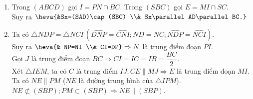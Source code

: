 \begin{bt}
{\begin{enumerate}
{}
			\item Trong $(ABCD)$ gọi $I=PN\cap BC$. Trong $(SBC)$ gọi $E=MI\cap SC$.\\
			Suy ra $\heva{&Sx=(SAD)\cap (SBC) \\& Sx\parallel AD\parallel BC.}$
			\item Ta có $\triangle NDP=\triangle NCI\, (\widehat{DNP}=\widehat{CNI}; ND=NC; \widehat{NDP}=\widehat{NCI})$.\\
			Suy ra $\heva{& NP=NI \\& CI=DP} \Rightarrow N$ là trung điểm đoạn $PI$.\\
			Gọi $J$ là trung điểm đoạn $BC \Rightarrow CI=IC=IB=\dfrac{BC}{2}$.\\
			Xét $\triangle IEM$, ta có $C$ là trung điểm $IJ; CE \parallel MJ \Rightarrow E$ là trung điểm đoạn $MI$.\\
			Ta có
			$NE \parallel PM$ ($NE$ là đường trung bình của $\triangle IPM$).\\
			$NE\not\subset (SBP); PM\subset (SBP)\Rightarrow NE\parallel(SBP)$.
		\end{enumerate}
	} 
\end{bt}


